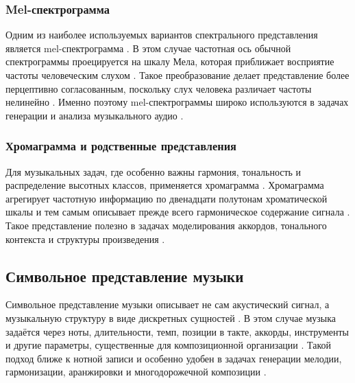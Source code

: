 \documentclass[a4paper,12pt]{extarticle}
\begin{document}
\subsubsection{Mel-спектрограмма}
\label{subsubsec:mel_spec}

Одним из наиболее используемых вариантов спектрального представления является mel-спектрограмма \cite{duan2025recent,ji2020comprehensive}. 
В этом случае частотная ось обычной спектрограммы проецируется на шкалу Мела, которая приближает восприятие частоты человеческим слухом \cite{duan2025recent,ji2020comprehensive}. 
Такое преобразование делает представление более перцептивно согласованным, поскольку слух человека различает частоты нелинейно \cite{duan2025recent}. 
Именно поэтому mel-спектрограммы широко используются в задачах генерации и анализа музыкального аудио \cite{duan2025recent,ji2020comprehensive}. 

\subsubsection{Хромаграмма и родственные представления}
\label{subsubsec:chromagram}

Для музыкальных задач, где особенно важны гармония, тональность и распределение высотных классов, применяется хромаграмма \cite{duan2025recent,ji2020comprehensive}. 
Хромаграмма агрегирует частотную информацию по двенадцати полутонам хроматической шкалы и тем самым описывает прежде всего гармоническое содержание сигнала \cite{duan2025recent}. 
Такое представление полезно в задачах моделирования аккордов, тонального контекста и структуры произведения \cite{duan2025recent,ji2020comprehensive}. 

\subsection{Символьное представление музыки}
\label{subsec:symbolic_representation}

Символьное представление музыки описывает не сам акустический сигнал, а музыкальную структуру в виде дискретных сущностей \cite{ji2023symbolic,duan2025recent,ji2020comprehensive}. 
В этом случае музыка задаётся через ноты, длительности, темп, позиции в такте, аккорды, инструменты и другие параметры, существенные для композиционной организации \cite{ji2023symbolic,duan2025recent}. 
Такой подход ближе к нотной записи и особенно удобен в задачах генерации мелодии, гармонизации, аранжировки и многодорожечной композиции \cite{ji2023symbolic,ji2020comprehensive}. 
\end{document}
